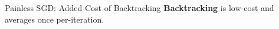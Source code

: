 \documentclass[mathserif,notheorems, hyperref={colorlinks, citecolor=blue, urlcolor=blue, linkcolor=blue}]{beamer}
\begin{document}
     
    \begin{frame}{Painless SGD: Added Cost of Backtracking}
        \textbf{Backtracking} is low-cost and averages once per-iteration.
        \begin{figure}
        \end{figure}

    \end{frame}
\end{document}
